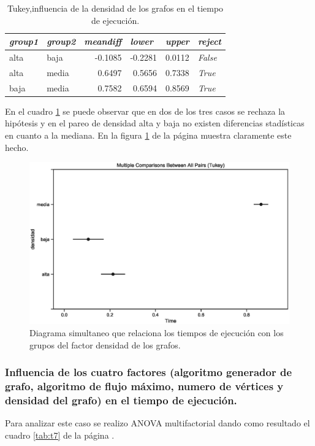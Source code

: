 \documentclass{article}
\begin{document}
\begin{table}[htbp]
  \centering
  \caption{Tukey,influencia de la densidad de los grafos en el tiempo de ejecución.}
    \begin{tabular}{llrrrl}
    \toprule
    \textit{\textbf{group1}} & \textit{\textbf{group2}} & \multicolumn{1}{l}{\textit{\textbf{meandiff}}} & \multicolumn{1}{l}{\textit{\textbf{lower}}} & \multicolumn{1}{l}{\textit{\textbf{upper}}} & \textit{\textbf{reject}} \\
    \midrule
    alta  & baja  & -0.1085 & -0.2281 & 0.0112 & \textit{False} \\
    alta  & media & 0.6497 & 0.5656 & 0.7338 & \textit{True} \\
    baja  & media & 0.7582 & 0.6594 & 0.8569 & \textit{True} \\
    \bottomrule
    \end{tabular}%
  \label{tab:t6}%
\end{table}%
En el cuadro \ref{tab:t6} se puede observar que en dos de los tres casos se rechaza la hipótesis y en el pareo de densidad alta y baja no existen diferencias stadísticas en cuanto a la mediana. En la figura \ref{fig9} de la página \pageref{fig9} muestra claramente este hecho.
\begin{center}
\begin{figure}[htbp]
\includegraphics[scale=0.6, width=\textwidth, trim=0 0 0 20, clip=true]{simultaneoustukeydensidad.eps}
\caption{Diagrama simultaneo que relaciona los tiempos de ejecución con los grupos del factor densidad de los grafos.}
\label{fig9}
\end{figure}
\end{center}
\subsubsection{Influencia de los cuatro factores (algoritmo generador de grafo, algoritmo de flujo máximo, numero de vértices y densidad del grafo) en el tiempo de ejecución.}
Para analizar este caso se realizo ANOVA multifactorial dando como resultado el cuadro \ref{tab:t7} de la página \pageref{tab:t7}.
\end{document}
